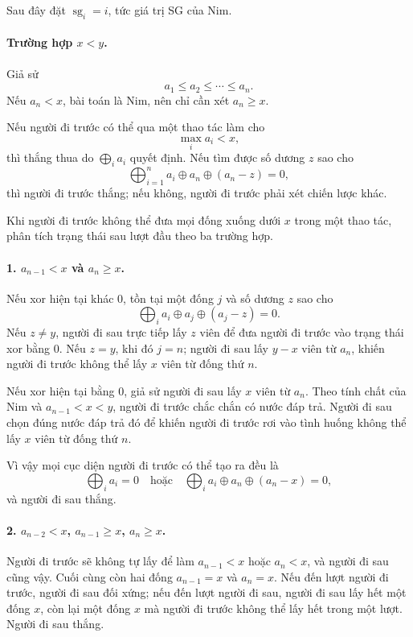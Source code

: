\documentclass[11pt]{article}
\begin{document}
Sau đây đặt $\operatorname{sg}_i=i$, tức giá trị SG của Nim.

\paragraph{Trường hợp $x<y$.}
Giả sử
\[
  a_1\le a_2\le\cdots\le a_n.
\]
Nếu $a_n<x$, bài toán là Nim, nên chỉ cần xét $a_n\ge x$.

Nếu người đi trước có thể qua một thao tác làm cho
\[
  \max_i a_i<x,
\]
thì thắng thua do $\bigoplus_i a_i$ quyết định. Nếu tìm được số dương $z$
sao cho
\[
  \bigoplus_{i=1}^{n}a_i\oplus a_n\oplus(a_n-z)=0,
\]
thì người đi trước thắng; nếu không, người đi trước phải xét chiến lược khác.

Khi người đi trước không thể đưa mọi đống xuống dưới $x$ trong một thao tác,
phân tích trạng thái sau lượt đầu theo ba trường hợp.

\paragraph{1. $a_{n-1}<x$ và $a_n\ge x$.}
Nếu xor hiện tại khác $0$, tồn tại một đống $j$ và số dương $z$ sao cho
\[
  \bigoplus_i a_i\oplus a_j\oplus(a_j-z)=0.
\]
Nếu $z\ne y$, người đi sau trực tiếp lấy $z$ viên để đưa người đi trước vào
trạng thái xor bằng $0$. Nếu $z=y$, khi đó $j=n$; người đi sau lấy
$y-x$ viên từ $a_n$, khiến người đi trước không thể lấy $x$ viên từ đống thứ
$n$.

Nếu xor hiện tại bằng $0$, giả sử người đi sau lấy $x$ viên từ $a_n$. Theo
tính chất của Nim và $a_{n-1}<x<y$, người đi trước chắc chắn có nước đáp trả.
Người đi sau chọn đúng nước đáp trả đó để khiến người đi trước rơi vào tình
huống không thể lấy $x$ viên từ đống thứ $n$.

Vì vậy mọi cục diện người đi trước có thể tạo ra đều là
\[
  \bigoplus_i a_i=0
  \quad\text{hoặc}\quad
  \bigoplus_i a_i\oplus a_n\oplus(a_n-x)=0,
\]
và người đi sau thắng.

\paragraph{2. $a_{n-2}<x$, $a_{n-1}\ge x$, $a_n\ge x$.}
Người đi trước sẽ không tự lấy để làm $a_{n-1}<x$ hoặc $a_n<x$, và người đi
sau cũng vậy. Cuối cùng còn hai đống $a_{n-1}=x$ và $a_n=x$. Nếu đến lượt
người đi trước, người đi sau đối xứng; nếu đến lượt người đi sau, người đi
sau lấy hết một đống $x$, còn lại một đống $x$ mà người đi trước không thể
lấy hết trong một lượt. Người đi sau thắng.
\end{document}
